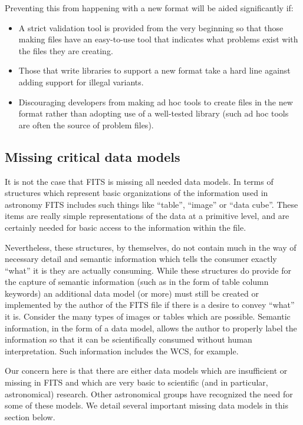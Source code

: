 \documentclass[final,authoryear,5p,times,twocolumn]{elsarticle}
\begin{document}
Preventing this from happening with a new format will be aided significantly if:

\begin{itemize}
\item A strict validation tool is provided from the very beginning so that
those making files have an easy-to-use tool that indicates what
problems exist with the files they are creating.

\item Those that write libraries to support a new format take a hard line
against adding support for illegal variants.

\item Discouraging developers from making ad hoc tools to create files in
the new format rather than adopting use of a well-tested library (such
ad hoc tools are often the source of problem files).
\end{itemize}

\subsection{Missing critical data models}


It is not the case that FITS is missing all needed data models. In
terms of structures which represent basic organizations of the
information used in astronomy FITS includes such things like ``table'',
``image'' or ``data cube''. These items are really simple representations
of the data at a primitive level, and are certainly needed for basic
access to the information within the file.


Nevertheless, these structures, by themselves, do not contain much in
the way of necessary detail and semantic information which tells the
consumer exactly ``what'' it is they are actually consuming. While these
structures do provide for the capture of semantic information (such as
in the form of table column keywords) an additional data model (or
more) must still be created or implemented by the author of the FITS
file if there is a desire to convey ``what'' it is. Consider the many
types of images or tables which are possible. Semantic information, in
the form of a data model, allows the author to properly label the
information so that it can be scientifically consumed without human
interpretation. Such information includes the WCS, for example.


Our concern here is that there are either data models which are
insufficient or missing in FITS and which are very basic to scientific
(and in particular, astronomical) research. Other astronomical groups
have recognized the need for some of these models. We detail
several important missing data models in this section below.
\end{document}
